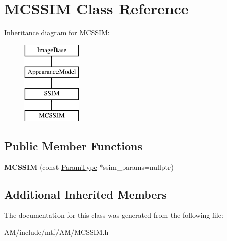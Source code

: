 \hypertarget{classMCSSIM}{\section{M\-C\-S\-S\-I\-M Class Reference}
\label{classMCSSIM}
}
Inheritance diagram for M\-C\-S\-S\-I\-M\-:\begin{figure}[H]
\begin{center}
\leavevmode
\includegraphics[height=4.000000cm]{classMCSSIM}
\end{center}
\end{figure}
\subsection*{Public Member Functions}
\begin{DoxyCompactItemize}
\item 
\hypertarget{classMCSSIM_a3b2f895b20acb3396147d03cb2ef6ce4}{{\bfseries M\-C\-S\-S\-I\-M} (const \hyperlink{structSSIMParams}{Param\-Type} $\ast$ssim\-\_\-params=nullptr)}\label{classMCSSIM_a3b2f895b20acb3396147d03cb2ef6ce4}

\end{DoxyCompactItemize}
\subsection*{Additional Inherited Members}


The documentation for this class was generated from the following file\-:\begin{DoxyCompactItemize}
\item 
A\-M/include/mtf/\-A\-M/M\-C\-S\-S\-I\-M.\-h\end{DoxyCompactItemize}
